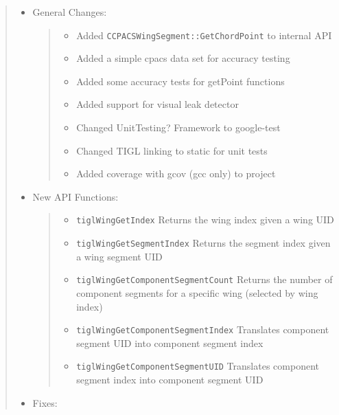 \documentclass[]{scrartcl}
\begin{document}
\begin{quote}
\begin{itemize}
\item
  General Changes:

  \begin{quote}
  \begin{itemize}
  \itemsep1pt\parskip0pt
  \item
    Added \texttt{CCPACSWingSegment::GetChordPoint} to internal API
  \item
    Added a simple cpacs data set for accuracy testing
  \item
    Added some accuracy tests for getPoint functions
  \item
    Added support for visual leak detector
  \item
    Changed UnitTesting? Framework to google-test
  \item
    Changed TIGL linking to static for unit tests
  \item
    Added coverage with gcov (gcc only) to project
  \end{itemize}
  \end{quote}
\item
  New API Functions:

  \begin{quote}
  \begin{itemize}
  \itemsep1pt\parskip0pt
  \item
    \texttt{tiglWingGetIndex} Returns the wing index given a wing UID
  \item
    \texttt{tiglWingGetSegmentIndex} Returns the segment index given a
    wing segment UID
  \item
    \texttt{tiglWingGetComponentSegmentCount} Returns the number of
    component segments for a specific wing (selected by wing index)
  \item
    \texttt{tiglWingGetComponentSegmentIndex} Translates component
    segment UID into component segment index
  \item
    \texttt{tiglWingGetComponentSegmentUID} Translates component segment
    index into component segment UID
  \end{itemize}
  \end{quote}
\item
  Fixes:


\end{itemize}
\end{quote}
\end{document}
